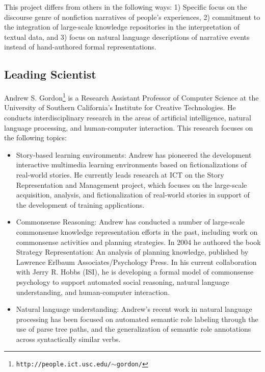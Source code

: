 \documentclass{article}[12pt]
\newcommand\url[1]{\texttt{#1}}
\begin{document}
This project differs from others in the following ways: 1) Specific focus on
the discourse genre of nonfiction narratives of people's experiences, 2)
commitment to the integration of large-scale knowledge repositories in the
interpretation of textual data, and 3) focus on natural language descriptions
of narrative events instead of hand-authored formal representations.

\subsection{Leading Scientist}

Andrew S. Gordon\footnote{\url{http://people.ict.usc.edu/$\sim$gordon/}} is a
Research Assistant Professor of Computer Science at the University of Southern
California's Institute for Creative Technologies. He conducts interdisciplinary
research in the areas of artificial intelligence, natural language processing,
and human-computer interaction. This research focuses on the following topics:

\begin{itemize}
  \item Story-based learning environments: Andrew has pioneered the development
  interactive multimedia learning environments based on fictionalizations of
  real-world stories. He currently leads research at ICT on the Story
  Representation and Management project, which focuses on the large-scale
  acquisition, analysis, and fictionalization of real-world stories in support
  of the development of training applications.  \item Commonsense Reasoning:
  Andrew has conducted a number of large-scale commonsense knowledge
  representation efforts in the past, including work on commonsense activities
  and planning strategies. In 2004 he authored the book Strategy
  Representation: An analysis of planning knowledge, published by Lawrence
  Erlbaum Associates/Psychology Press. In his current collaboration with Jerry
  R. Hobbs (ISI), he is developing a formal model of commonsense psychology to
  support automated social reasoning, natural language understanding, and
  human-computer interaction.  \item Natural language understanding: Andrew's
  recent work in natural language processing has been focused on automated
  semantic role labeling through the use of parse tree paths, and the
  generalization of semantic role annotations across syntactically similar
  verbs.
\end{itemize}
\end{document}
